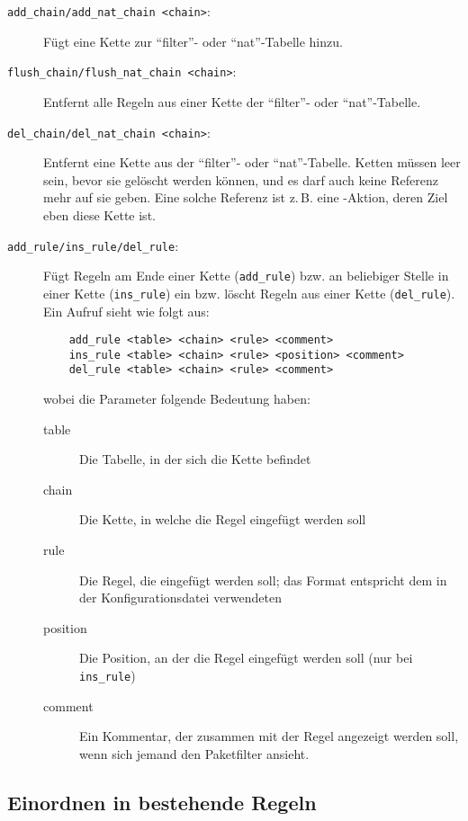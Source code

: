 \begin{description}
\item [\texttt{add\_chain/add\_nat\_chain <chain>}:]
  Fügt eine Kette zur "`filter"'- oder "`nat"'-Ta\-bel\-le hinzu.
\item [\texttt{flush\_chain/flush\_nat\_chain <chain>}:]
  Entfernt alle Regeln aus einer Kette der "`filter"'- oder "`nat"'-Tabelle.
\item [\texttt{del\_chain/del\_nat\_chain <chain>}:]
  Entfernt eine Kette aus der "`filter"'- oder "`nat"'-Tabelle. Ketten müssen
  leer sein, bevor sie gelöscht werden können, und es darf auch keine Referenz
  mehr auf sie geben. Eine solche Referenz ist z.\,B. eine -Aktion,
  deren Ziel eben diese Kette ist.
\item[\texttt{add\_rule/ins\_rule/del\_rule}:] Fügt Regeln
  am Ende einer Kette (\texttt{add\_rule}) bzw. an beliebiger Stelle in einer
  Kette (\texttt{ins\_rule}) ein bzw. löscht Regeln aus einer Kette
  (\texttt{del\_rule}). Ein Aufruf sieht wie folgt aus:

\begin{example}
\begin{verbatim}
    add_rule <table> <chain> <rule> <comment>
    ins_rule <table> <chain> <rule> <position> <comment>
    del_rule <table> <chain> <rule> <comment>
\end{verbatim}
\end{example}

  \noindent wobei die Parameter folgende Bedeutung haben:
  \begin{description}
  \item[table] Die Tabelle, in der sich die Kette befindet
  \item[chain] Die Kette, in welche die Regel eingefügt werden soll
  \item[rule] Die Regel, die eingefügt werden soll; das Format
    entspricht dem in der Konfigurationsdatei verwendeten
  \item[position] Die Position, an der die Regel eingefügt werden soll (nur
    bei \texttt{ins\_rule})
  \item[comment] Ein Kommentar, der zusammen mit der Regel angezeigt
    werden soll, wenn sich jemand den Paketfilter ansieht.
  \end{description}
\end{description}


\subsection{Einordnen in bestehende Regeln}

